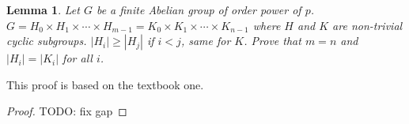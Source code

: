 \documentclass[14pt]{extarticle}
\newtheorem{lemma}{Lemma}[section]
\newcommand{\join}[3][,]{#2_0 #1 #2_1 #1 \cdots #1 #2_{#3}}
\newcommand{\1}{\{e\}}
\begin{document}
\begin{lemma}
  Let $G$ be a finite Abelian group of order power of $p$.
  $G = \join[\times]{H}{m - 1} = \join[\times]{K}{n - 1}$
  where $H$ and $K$ are non-trivial cyclic subgroups.
  $|H_i| \geq |H_j|$ if $i < j$, same for $K$.
  Prove that $m = n$ and $|H_i| = |K_i|$ for all $i$.
\end{lemma}
This proof is based on the textbook one.
\begin{proof}
  TODO: fix gap
\end{proof}
\end{document}

